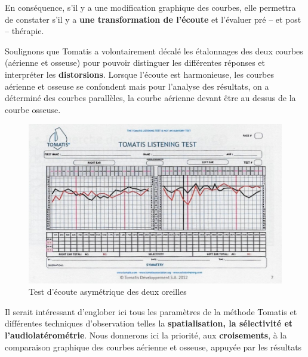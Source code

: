  En  conséquence,  s'il y a une modification
          graphique des courbes, elle
          permettra de constater s'il y a \textbf{une transformation de l'écoute}
          et l'évaluer pré -- et
          post -- thérapie.




Soulignons que Tomatis a volontairement décalé les étalonnages des deux courbes (aérienne et osseuse) pour pouvoir distinguer les différentes réponses et interpréter
	les \textbf{distorsions}. Lorsque l'écoute est harmonieuse, les
	courbes aérienne et osseuse se confondent mais pour l'analyse des
	résultats, on a déterminé des courbes parallèles, la courbe aérienne
	devant être au dessus de la courbe osseuse.


\begin{figure}
	\centering
	\includegraphics[width=1\linewidth]{images/tomatisListeningTest.jpg}
	\caption[Test d'écoute]{Test
          d'écoute asymétrique des deux oreilles}
	\label{Test d'écoute asymétrique avec oreille droite et oreille gauche}
\end{figure}
 Il serait intéressant d'englober ici tous les paramètres de la méthode Tomatis et différentes techniques 
 d'observation telles la \textbf{spatialisation, la sélectivité et l'audiolatérométrie}. 
Nous
donnerons ici la priorité, aux \textbf{croisements}, à la comparaison graphique
des courbes aérienne et osseuse, appuyée  par les résultats
